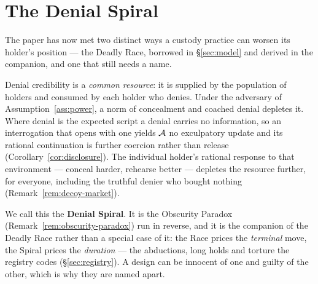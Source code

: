 \section{The Denial Spiral}
\label{sec:spiral}

\begin{remark}\label{rem:denial-spiral}
The paper has now met two distinct ways a custody practice can worsen its
holder's position --- the Deadly Race, borrowed in \S\ref{sec:model} and derived
in the companion, and one that still needs a name.

Denial credibility is a \emph{common resource}: it is supplied by the population of
holders and consumed by each holder who denies. Under the adversary of
Assumption~\ref{ass:power}, a norm of concealment and coached denial depletes it. Where
denial is the expected script a denial carries no information, so an interrogation that
opens with one yields $\mathcal{A}$ no exculpatory update and its rational continuation is
further coercion rather than release (Corollary~\ref{cor:disclosure}). The individual
holder's rational response to that environment --- conceal harder, rehearse better ---
depletes the resource further, for everyone, including the truthful denier who bought
nothing (Remark~\ref{rem:decoy-market}).

We call this the \textbf{Denial Spiral}. It is the Obscurity Paradox
(Remark~\ref{rem:obscurity-paradox}) run in reverse, and it is the companion of the
Deadly Race rather than a special case of it: the Race prices the \emph{terminal} move,
the Spiral prices the \emph{duration} --- the abductions, long holds and torture the
registry codes (\S\ref{sec:registry}). A design can be innocent of one and guilty of
the other, which is why they are named apart.
\end{remark}

